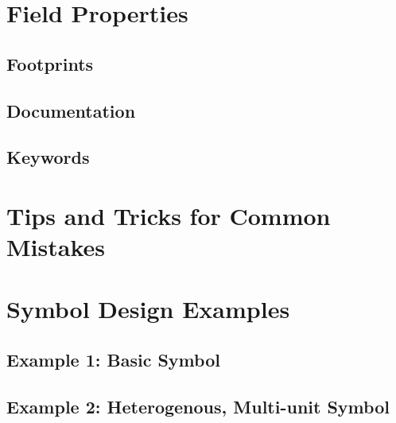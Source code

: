 \section{Field Properties}
\subsection{Footprints}
\subsection{Documentation}
\subsection{Keywords}

\section{Tips and Tricks for Common Mistakes}

\section{Symbol Design Examples}
\subsection{Example 1: Basic Symbol}
\subsection{Example 2: Heterogenous, Multi-unit Symbol}